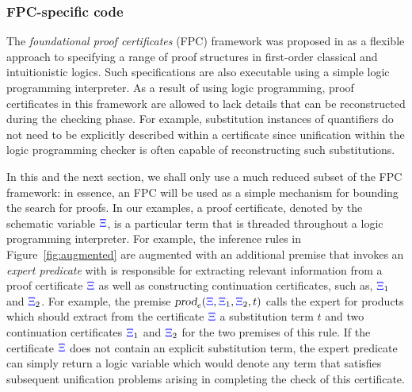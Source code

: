 \subsubsection{FPC-specific code}
\label{ssec:fpc}


The \emph{foundational proof certificates} (FPC) framework was
proposed in \cite{chihani17jar} as a flexible approach to specifying a
range of proof structures in first-order classical and intuitionistic
logics.  Such specifications are also executable using a simple logic
programming interpreter.  As a result of using logic programming,
proof certificates in this framework are allowed to lack details that
can be reconstructed during the checking phase.  For example,
substitution instances of quantifiers do not need to be explicitly
described within a certificate since unification within the logic
programming checker is often capable of reconstructing such
substitutions.

In this and the next section, we shall only use a much reduced subset
of the FPC framework: in essence, an FPC will be used as a simple
mechanism for bounding the search for proofs.  In our examples, a
proof certificate, denoted by the schematic variable ${\color{blue}{\Xi}}$, is a
particular term that is threaded throughout a logic programming
interpreter.  For example, the inference rules in
Figure~\ref{fig:augmented} are augmented with an additional premise
that invokes an \emph{expert predicate} with is responsible for
extracting relevant information from a proof certificate ${\color{blue}{\Xi}}$ as
well as constructing continuation certificates, such as, ${\color{blue}{\Xi}}_1$ and
${\color{blue}{\Xi}}_2$.  For example, the premise $\hbox{\sl prod}_e({\color{blue}{\Xi}},{\color{blue}{\Xi}}_1,{\color{blue}{\Xi}}_2,t)$
calls the expert for products which should extract from the
certificate ${\color{blue}{\Xi}}$ a substitution term $t$ and two continuation
certificates ${\color{blue}{\Xi}}_1$ and ${\color{blue}{\Xi}}_2$ for the two premises of this rule.
If the certificate ${\color{blue}{\Xi}}$ does not contain an explicit substitution
term, the expert predicate can simply return a logic variable which
would denote any term that satisfies subsequent unification problems
arising in completing the check of this certificate.

